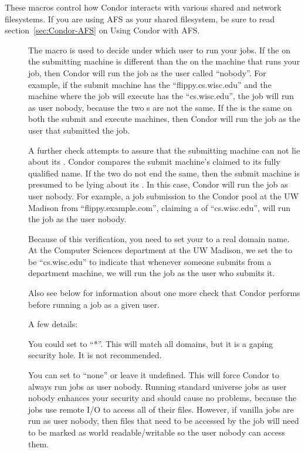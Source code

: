 These macros control how Condor interacts with various shared and
network filesystems.  If you are using AFS as your shared filesystem,
be sure to read section~\ref{sec:Condor-AFS} on Using Condor with
AFS.
\begin{description}

\item[] \label{param:UidDomain}
The  macro
is used to decide under which user to run your jobs.
If the 
on the submitting machine is different than
the 
on the machine that runs your job, then Condor will run
the job as the user called ``nobody''.
For example, if the submit machine has
the 
``flippy.cs.wisc.edu'' and the machine where the job will execute
has the 
``cs.wisc.edu'', the job will run as user nobody, because
the two s are not the same.
If the 
is the same on both the submit and execute machines,
then Condor will run the job as the user that submitted the job.

A further check attempts to assure that the submitting
machine can not lie about its .
Condor compares the 
submit machine's claimed 
to its fully qualified name.
If the two do not end the same, then the submit machine
is presumed to be lying about its .
In this case, Condor will run the job as user nobody.
For example, a job submission to the Condor pool at the UW Madison
from ``flippy.example.com'', claiming a 
of ``cs.wisc.edu'',
will run the job as the user nobody.

Because of this verification, you need to set your
to a real domain name. At the Computer Sciences department
at the UW Madison, we set the 
to be ``cs.wisc.edu'' to
indicate that whenever someone submits from a department machine, we
will run the job as the user who submits it.

Also see 
below for information about one more check
that Condor performs before running a job as a given user.

A few details:

You could set 
to ``*''. This will match all domains,
but it is a gaping security hole. It is not recommended.

You can set 
to ``none'' or leave it undefined. This will
force Condor to always run jobs as user nobody.
Running standard universe jobs as user nobody enhances
your security and should cause no problems, because the jobs use remote
I/O to access all of their files.
However, if vanilla jobs are run as
user nobody, then files that need to be accessed by the job will need
to be marked as world readable/writable so the user nobody can access
them.


\end{description}
